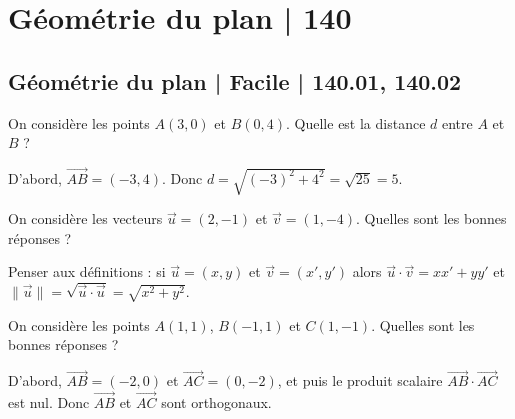 



\section{Géométrie du plan | 140}

\subsection{Géométrie du plan | Facile | 140.01, 140.02}

\begin{question}
On considère les points $A(3,0)$ et $B(0,4)$. Quelle est la distance $d$ entre $A$ et $B$ ?
\begin{answers}  
\end{answers}
\begin{explanations}
D'abord, $\overrightarrow{AB}=(-3,4)$. Donc $d=\sqrt{(-3)^2+4^2}=\sqrt{25}=5$.
\end{explanations}
\end{question}

\begin{question}
On considère les vecteurs $\vec{u}=(2,-1)$ et $\vec{v}=(1,-4)$. Quelles sont les bonnes réponses ?
\begin{answers}  
\end{answers}
\begin{explanations}
Penser aux définitions : si $\vec{u}=(x,y)$ et $\vec{v}=(x',y')$ alors
$\vec{u}\cdot \vec{v} = xx'+yy'$ et $\|\vec{u}\| = \sqrt{\vec{u}\cdot \vec{u}}
= \sqrt{x^2+y^2}$.
\end{explanations}
\end{question}


\begin{question}
On considère les points $A(1,1)$, $B(-1,1)$ et $C(1,-1)$. Quelles sont les bonnes réponses ?
\begin{answers}  
\end{answers}
\begin{explanations}
D'abord, $\overrightarrow{AB}=(-2,0)$ et $\overrightarrow{AC}=(0,-2)$, et puis le produit scalaire $\overrightarrow{AB}\cdot\overrightarrow{AC}$ est nul. Donc $\overrightarrow{AB}$ et $\overrightarrow{AC}$ sont orthogonaux.
\end{explanations}
\end{question}



